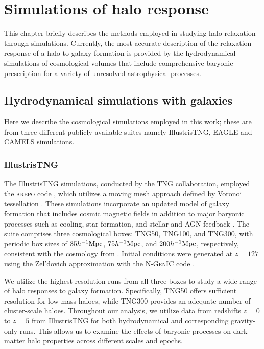 \chapter{Simulations of halo response}
\label{chap:sims-hals}

This chapter briefly describes the methods employed in studying halo relaxation through simulations. Currently, the most accurate description of the relaxation response of a halo to galaxy formation is provided by the hydrodynamical simulations of cosmological volumes that include comprehensive baryonic prescription for a variety of unresolved astrophysical processes.

\section{Hydrodynamical simulations with galaxies}
\label{sec:sims}
Here we describe the cosmological simulations employed in this work; these are from three different publicly available suites namely IllustrisTNG, EAGLE and CAMELS simulations.
\subsection{IllustrisTNG}
\label{sec:sims-IllTNG}
The IllustrisTNG simulations, conducted by the TNG collaboration, employed the \textsc{arepo} code \citep[][]{2020ApJS..248...32W}, which utilizes a moving mesh approach defined by Voronoi tessellation \citep[][]{2010MNRAS.401..791S}. These simulations incorporate an updated model of galaxy formation that includes cosmic magnetic fields in addition to major baryonic processes such as cooling, star formation, and stellar and AGN feedback \citep[][]{2017MNRAS.465.3291W,2018MNRAS.473.4077P}. The suite comprises three cosmological boxes: TNG50, TNG100, and TNG300, with periodic box sizes of $35 h^{-1}{\rm Mpc}$, $75 h^{-1}{\rm Mpc}$, and $200 h^{-1}{\rm Mpc}$, respectively, consistent with the cosmology from \cite{2016A&A...594A..13P}. Initial conditions were generated at $z=127$ using the Zel'dovich approximation \citep[][]{1970A&A.....5...84Z} with the \textsc{N-GenIC} code \citep[][]{2015ascl.soft02003S}. 

We utilize the highest resolution runs from all three boxes to study a wide range of halo responses to galaxy formation. Specifically, TNG50 offers sufficient resolution for low-mass haloes, while TNG300 provides an adequate number of cluster-scale haloes. Throughout our analysis, we utilize data from redshifts $z=0$ to $z=5$ from IllustrisTNG for both hydrodynamical and corresponding gravity-only runs. This allows us to examine the effects of baryonic processes on dark matter halo properties across different scales and epochs.

